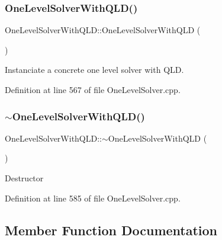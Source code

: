 \subsubsection{\texorpdfstring{One\+Level\+Solver\+With\+Q\+L\+D()}{OneLevelSolverWithQLD()}}
{\footnotesize\ttfamily One\+Level\+Solver\+With\+Q\+L\+D\+::\+One\+Level\+Solver\+With\+Q\+LD (\begin{DoxyParamCaption}{ }\end{DoxyParamCaption})}

Instanciate a concrete one level solver with Q\+LD. 

Definition at line 567 of file One\+Level\+Solver.\+cpp.

\hypertarget{classocra_1_1OneLevelSolverWithQLD_aaedebe9fe695e3bca4a9010b88386fcc}{}\label{classocra_1_1OneLevelSolverWithQLD_aaedebe9fe695e3bca4a9010b88386fcc} 
\subsubsection{\texorpdfstring{$\sim$\+One\+Level\+Solver\+With\+Q\+L\+D()}{~OneLevelSolverWithQLD()}}
{\footnotesize\ttfamily One\+Level\+Solver\+With\+Q\+L\+D\+::$\sim$\+One\+Level\+Solver\+With\+Q\+LD (\begin{DoxyParamCaption}{ }\end{DoxyParamCaption})\hspace{0.3cm}{\ttfamily [virtual]}}

Destructor 

Definition at line 585 of file One\+Level\+Solver.\+cpp.



\subsection{Member Function Documentation}
\hypertarget{classocra_1_1OneLevelSolverWithQLD_a8dc1522a50198d0120de3b29e94d66e8}{}\label{classocra_1_1OneLevelSolverWithQLD_a8dc1522a50198d0120de3b29e94d66e8} 
